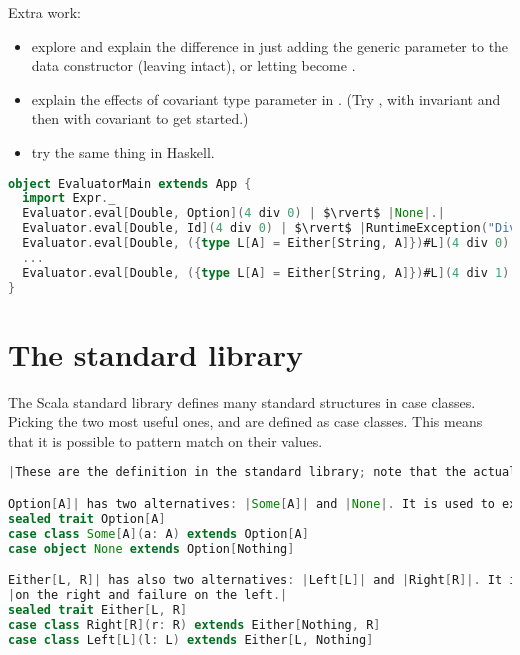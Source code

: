 \documentclass[10 pt]{article}
\begin{document}
\begin{example}


Extra work: \begin{itemize}
  \item explore and explain the difference in just adding the generic parameter to the  data constructor (leaving  intact), or letting  become .
  \item explain the effects of covariant type parameter in . (Try , with invariant  and then with covariant  to get started.)
  \item try the same thing in Haskell.
\end{itemize}


\begin{lstlisting}[caption={Flexible evaluator (with DSL)}, label={code:eepm4}, language=Scala, escapechar=|]
object EvaluatorMain extends App {
  import Expr._
  Evaluator.eval[Double, Option](4 div 0) | $\rvert$ |None|.|
  Evaluator.eval[Double, Id](4 div 0) | $\rvert$ |RuntimeException("Division by zero")|.|
  Evaluator.eval[Double, ({type L[A] = Either[String, A]})#L](4 div 0) | $\rvert$ |Left("Division by zero")|.|
  ...
  Evaluator.eval[Double, ({type L[A] = Either[String, A]})#L](4 div 1) | $\rvert$ |Right(4.0)|.|
}
\end{lstlisting}
\end{example}


\section{The standard library}
The Scala standard library defines many standard structures in case classes. Picking the two most useful ones,  and  are defined as case classes. This means that it is possible to pattern match on their values.

\begin{lstlisting}[caption={Pattern matching in stdlib}, label={code:pm4}, language=Scala, escapechar=|]
|These are the definition in the standard library; note that the actual definitions are more complex, but this code expresses the essence.|

Option[A]| has two alternatives: |Some[A]| and |None|. It is used to express one-or-missing values.|
sealed trait Option[A]
case class Some[A](a: A) extends Option[A]
case object None extends Option[Nothing]

Either[L, R]| has also two alternatives: |Left[L]| and |Right[R]|. It is used to express success or failure, with success by convention|
|on the right and failure on the left.|
sealed trait Either[L, R]
case class Right[R](r: R) extends Either[Nothing, R]
case class Left[L](l: L) extends Either[L, Nothing]
\end{lstlisting}
\end{document}
